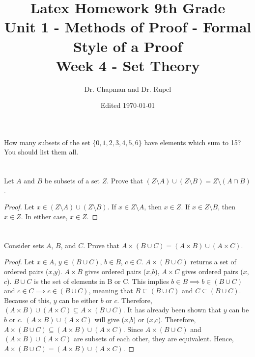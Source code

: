 \documentclass{article}
\title{Latex Homework 9th Grade\\ Unit 1 - Methods of Proof - Formal Style of a Proof\\ Week 4 - Set Theory}
\author{Dr. Chapman and Dr. Rupel}
\date{Edited \today}
\newcommand{\sm}{\setminus}
\begin{document}
\maketitle

\section{}
    How many subsets of the set \(\{0,1,2,3,4,5,6\}\) have elements which sum to 15?
    You should list them all.

\section{}
    Let $A$ and $B$ be subsets of a set $Z$.
    Prove that $(Z\sm A)\cup(Z\sm B)=Z\sm(A\cap B)$.
    \begin{proof}
     Let $x \in (Z\sm A)\cup(Z\sm B)$. If $x\in Z\sm A$, then $x\in Z$. If $x\in Z\sm B$, then $x\in Z$. In either case, $x\in Z$.
    \end{proof}
\section{}
    Consider sets $A$, $B$, and $C$.
    Prove that $A\times(B\cup C)=(A\times B)\cup(A\times C)$.
	\begin{proof}
	Let $x\in A$, $y\in(B\cup C)$, $b\in B$, $c\in C$. $A\times(B\cup C)$ returns a set of ordered pairs ($x$,$y$). $A\times B$ gives ordered pairs ($x$,$b$), $A\times C$ gives ordered pairs ($x$, $c$). $B\cup C$ is the set of elements in B or C. This implies $b\in B \implies b\in(B\cup C)$ and $c\in C\implies c\in(B\cup C)$, meaning that $B\subseteq (B\cup C)$ and $C\subseteq (B\cup C)$. Because of this, $y$ can be either $b$ or $c$. Therefore, $(A\times B)\cup(A\times C)\subseteq A\times(B\cup C)$. It has already been shown that $y$ can be $b$ or $c$. $(A\times B)\cup(A\times C)$ will give ($x$,$b$) or ($x$,$c$). Therefore, $A\times(B\cup C)\subseteq(A\times B)\cup(A\times C)$. Since $A\times(B\cup C)$ and $(A\times B)\cup(A\times C)$ are subsets of each other, they are equivalent. Hence, $A\times(B\cup C)=(A\times B)\cup(A\times C)$. 
	\end{proof}
\end{document}
